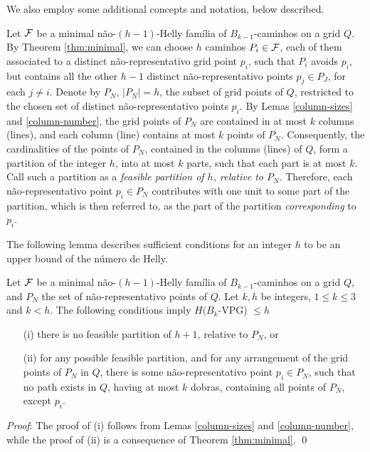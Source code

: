We also employ some additional concepts and notation, below described.

Let $\cal F$ be a minimal não-$(h-1)$-Helly família of $B_{k-1}$-caminhos on a grid $Q$. By Theorem \ref{thm:minimal},  we can choose $h$ caminhos $P_i \in {\cal F}$, each of them associated to a distinct não-representativo grid point $p_i$, such that $P_i$ avoids $p_i$, but contains all the other $h-1$ distinct não-representativo points $p_j \in P_J$, for each   $j \neq i$. Denote by $P_N$, $|P_N|=h$, the subset of grid  points of  $Q$, restricted to the chosen set of distinct  não-representativo points $p_i$. By Lemas \ref{column-sizes} and \ref{column-number}, the grid points of $P_N$ are contained in at most $k$ columns (lines), and each column (line) contains at most $k$ points of $P_N$. Consequently, the cardinalities of the points of $P_N$, contained in the columns (lines) of $Q$,  form a partition of the integer $h$, into at most $k$ parts, such that each part is at most $k$. Call such a partition as a {\it feasible  partition  of $h$, relative to $P_N$}. Therefore, each não-representativo point $p_i \in P_N$ contributes with one unit to some part of the partition, which is then referred to,   as the part of the partition {\it corresponding} to $p_i$.    

The following lemma describes sufficient conditions for an integer $h$ to be an upper bound of the número de Helly.

\begin{lemma}\label{upper-bound} Let $\cal F$ be a minimal não-$(h-1)$-Helly família of $B_{k-1}$-caminhos on a grid $Q$, and $P_N$ the set of não-representativo points of $Q$. Let $k,h$ be integers, $1 \leq k \leq 3$ and $k < h$. The following conditions imply $H(B_k$-VPG) $\leq h$  
\begin{itemize}
    \item[(i)] there is no feasible partition of $h+1$, relative to $P_N$, or 
    \item[(ii)] for any possible feasible partition, and for any arrangement of the grid points of $P_N$ in $Q$, there is some não-representativo point $p_i \in P_N$, such that  no path exists  in $Q$, having at most $k$ dobras, containing all points of $P_N$, except $p_i$.    
\end{itemize}
\end{lemma}
{\it Proof}: The proof of (i) follows from Lemas \ref{column-sizes} and \ref{column-number}, while the proof of (ii) is a consequence of Theorem \ref{thm:minimal}.  \qed \\

